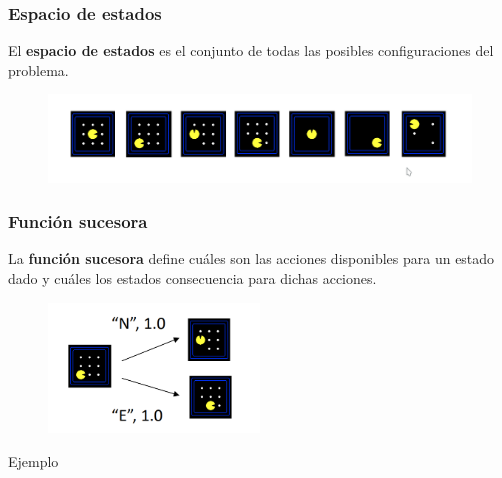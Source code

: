 \documentclass[10pt]{beamer}
\begin{document}
\begin{frame}
  \frametitle{Espacio de estados}
  El \textbf{espacio de estados} es el conjunto de todas las posibles configuraciones del problema.

  \begin{figure}[!h] 
    \centering
    \includegraphics[width=1\textwidth]{img/state_space}
  \end{figure} 

\end{frame}

\begin{frame}
  \frametitle{Función sucesora}
  La \textbf{función sucesora} define cuáles son las acciones disponibles para un estado dado y 
  cuáles los estados consecuencia para dichas acciones.

  \begin{figure}[!h] 
    \centering
    \includegraphics[width=0.5\textwidth]{img/sucesora}
  \end{figure} 

\end{frame}


{
\begin{frame}[standout]
  Ejemplo
\end{frame}
}
\end{document}
